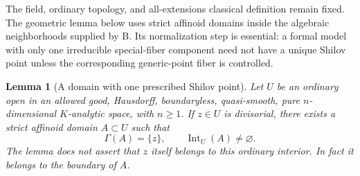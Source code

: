 \documentclass[11pt,a4paper]{article}
\numberwithin{equation}{section}
\newtheorem{lemma}[theorem]{Lemma}
\theoremstyle{definition}
\theoremstyle{remark}
\begin{document}
The field, ordinary topology, and all-extensions classical definition
remain fixed. The geometric lemma below uses strict affinoid domains
inside the algebraic neighborhoods supplied by \textup{B}. Its
normalization step is essential: a formal model with only one
irreducible special-fiber component need not have a unique Shilov
point unless the corresponding generic-point fiber is controlled.

\begin{lemma}[A domain with one prescribed Shilov point]
\label{lem:r2-one-shilov-domain}
Let $U$ be an ordinary open in an allowed good, Hausdorff,
boundaryless, quasi-smooth, pure $n$-dimensional $K$-analytic space,
with $n\geq1$. If $z\in U$ is divisorial, there exists a strict
affinoid domain $A\subset U$ such that
\[
 \Gamma(A)=\{z\},\qquad \operatorname{Int}_U(A)\ne\varnothing.
\]
The lemma does not assert that $z$ itself belongs to this ordinary
interior. In fact it belongs to the boundary of $A$.
\end{lemma}
\end{document}
